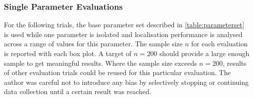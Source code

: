 \subsubsection{Single Parameter Evaluations}

For the following trials, the base parameter set described in \autoref{table:parameterset} is used while one parameter is isolated and localisation performance is analysed across a range of values for this parameter. The sample size $n$ for each evaluation is reported with each box plot. A target of $n=200$ should provide a large enough sample to get meaningful results. Where the sample size exceeds $n=200$, results of other evaluation trials could be reused for this particular evaluation. The author was careful not to introduce any bias by selectively stopping or continuing data collection until a certain result was reached.